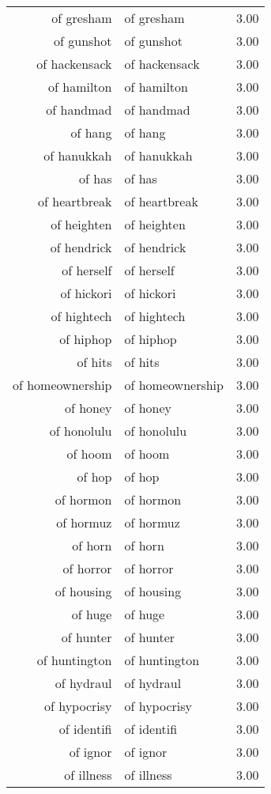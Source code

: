 \begin{table}[ht]
\begin{tabular}{rlr}
  of gresham & of gresham & 3.00 \\ 
  of gunshot & of gunshot & 3.00 \\ 
  of hackensack & of hackensack & 3.00 \\ 
  of hamilton & of hamilton & 3.00 \\ 
  of handmad & of handmad & 3.00 \\ 
  of hang & of hang & 3.00 \\ 
  of hanukkah & of hanukkah & 3.00 \\ 
  of has & of has & 3.00 \\ 
  of heartbreak & of heartbreak & 3.00 \\ 
  of heighten & of heighten & 3.00 \\ 
  of hendrick & of hendrick & 3.00 \\ 
  of herself & of herself & 3.00 \\ 
  of hickori & of hickori & 3.00 \\ 
  of hightech & of hightech & 3.00 \\ 
  of hiphop & of hiphop & 3.00 \\ 
  of hits & of hits & 3.00 \\ 
  of homeownership & of homeownership & 3.00 \\ 
  of honey & of honey & 3.00 \\ 
  of honolulu & of honolulu & 3.00 \\ 
  of hoom & of hoom & 3.00 \\ 
  of hop & of hop & 3.00 \\ 
  of hormon & of hormon & 3.00 \\ 
  of hormuz & of hormuz & 3.00 \\ 
  of horn & of horn & 3.00 \\ 
  of horror & of horror & 3.00 \\ 
  of housing & of housing & 3.00 \\ 
  of huge & of huge & 3.00 \\ 
  of hunter & of hunter & 3.00 \\ 
  of huntington & of huntington & 3.00 \\ 
  of hydraul & of hydraul & 3.00 \\ 
  of hypocrisy & of hypocrisy & 3.00 \\ 
  of identifi & of identifi & 3.00 \\ 
  of ignor & of ignor & 3.00 \\ 
  of illness & of illness & 3.00 \\ 

\end{tabular}
\end{table}
